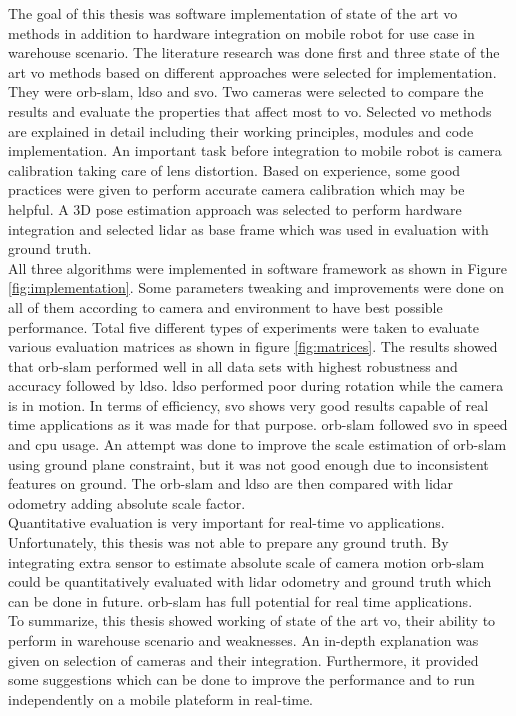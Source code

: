 The goal of this thesis was software implementation of state of the art \acrshort{vo} methods in addition to hardware integration on mobile robot for use case in warehouse scenario. The literature research was done first and three state of the art \acrshort{vo} methods based on different approaches were selected for implementation. They were \acrshort{orb}-\acrshort{slam}, \acrshort{ldso} and \acrshort{svo}. Two cameras were selected to compare the results and evaluate the properties that affect most to \acrshort{vo}. Selected \acrshort{vo} methods are explained in detail including their working principles, modules and code implementation. An important task before integration to mobile robot is camera calibration taking care of lens distortion. Based on experience, some good practices were given to perform accurate camera calibration which may be helpful. A 3D pose estimation approach was selected to perform hardware integration and selected \acrshort{lidar} as base frame which was used in evaluation with ground truth.\\
\newline
All three algorithms were implemented in software framework as shown in Figure \ref{fig:implementation}. Some parameters tweaking and improvements were done on all of them according to camera and environment to have best possible performance. Total five different types of experiments were taken to evaluate various evaluation matrices as shown in figure \ref{fig:matrices}. The results showed that \acrshort{orb}-\acrshort{slam} performed well in all data sets with highest robustness and accuracy followed by \acrshort{ldso}. \acrshort{ldso} performed poor during rotation while the camera is in motion. In terms of efficiency, \acrshort{svo} shows very good results capable of real time applications as it was made for that purpose. \acrshort{orb}-\acrshort{slam} followed \acrshort{svo} in speed and \acrshort{cpu} usage. An attempt was done to improve the scale estimation of \acrshort{orb}-\acrshort{slam} using ground plane constraint, but it was not good enough due to inconsistent features on ground. The \acrshort{orb}-\acrshort{slam} and \acrshort{ldso} are then compared with \acrshort{lidar} odometry adding absolute scale factor. \\
\newline Quantitative evaluation is very important for real-time \acrshort{vo} applications. Unfortunately, this thesis was not able to prepare any ground truth. By integrating extra sensor to estimate absolute scale of camera motion \acrshort{orb}-\acrshort{slam} could be quantitatively evaluated with \acrshort{lidar} odometry and ground truth which can be done in future. \acrshort{orb}-\acrshort{slam} has full potential for real time applications.\\
\newline
To summarize, this thesis showed working of state of the art \acrshort{vo}, their ability to perform in warehouse scenario and weaknesses. An in-depth explanation was given on selection of cameras and their integration. Furthermore, it provided some suggestions which can be done to improve the performance and to run independently on a mobile plateform in real-time.